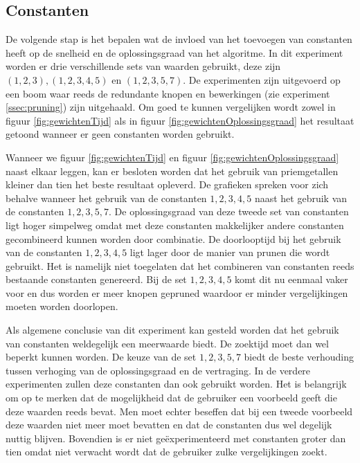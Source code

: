 \documentclass[Main.tex]{subfiles}
\begin{document}
\subsection{Constanten}
De volgende stap is het bepalen wat de invloed van het toevoegen van constanten heeft op de snelheid en de oplossingsgraad van het algoritme. In dit experiment worden er drie verschillende sets van waarden gebruikt, deze zijn $(1,2,3), (1,2,3,4,5)$ en $(1,2,3,5,7)$. De experimenten zijn uitgevoerd op een boom waar reeds de redundante knopen en bewerkingen (zie experiment \ref{ssec:pruning}) zijn uitgehaald. Om goed te kunnen vergelijken wordt zowel in figuur \ref{fig:gewichtenTijd} als in figuur \ref{fig:gewichtenOplossingsgraad} het resultaat getoond wanneer er geen constanten worden gebruikt. 
\par Wanneer we figuur \ref{fig:gewichtenTijd} en figuur \ref{fig:gewichtenOplossingsgraad} naast elkaar leggen, kan er besloten worden dat het gebruik van priemgetallen kleiner dan tien het beste resultaat opleverd. De grafieken spreken voor zich behalve wanneer het gebruik van de constanten $1, 2, 3, 4, 5$  naast het gebruik van de constanten $1, 2, 3, 5, 7$. De oplossingsgraad van deze tweede set van constanten ligt hoger simpelweg omdat met deze constanten makkelijker andere constanten gecombineerd kunnen worden door combinatie. De doorlooptijd bij het gebruik van de constanten $1, 2, 3, 4, 5$ ligt lager door de manier van prunen die wordt gebruikt. Het is namelijk niet toegelaten dat het combineren van constanten reeds bestaande constanten genereerd. Bij de set $1, 2, 3, 4, 5$ komt dit nu eenmaal vaker voor en dus worden er meer knopen gepruned waardoor er minder vergelijkingen moeten worden doorlopen.\par
Als algemene conclusie van dit experiment kan gesteld worden dat het gebruik van constanten weldegelijk een meerwaarde biedt. De zoektijd moet dan wel beperkt kunnen worden. De keuze van de set $1, 2, 3, 5, 7$ biedt de beste verhouding tussen verhoging van de oplossingsgraad en de vertraging. In de verdere experimenten zullen deze constanten dan ook gebruikt worden. Het is belangrijk om op te merken dat de mogelijkheid dat de gebruiker een voorbeeld geeft die deze waarden reeds bevat. Men moet echter beseffen dat bij een tweede voorbeeld deze waarden niet meer moet bevatten en dat de constanten dus wel degelijk nuttig blijven. Bovendien is er niet ge\"experimenteerd met constanten groter dan tien omdat niet verwacht wordt dat de gebruiker zulke vergelijkingen zoekt.
\end{document}
